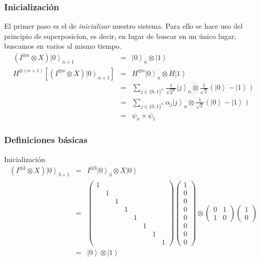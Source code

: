 \begin{frame}
\frametitle{Inicialización}
El primer paso es el de \textit{inicializar} nuestro sistema. Para ello se hace uso del principio de superposicíon, es decir, en lugar de buscar en un único lugar, buscamos en varios al mismo tiempo.
\pause
\begin{eqnarray}
(I^{\otimes n}\otimes X)\left.|0\right\rangle _{n+1}&=&\left.|0\right\rangle _{n}\otimes\left.|1\right\rangle \nonumber\\
H^{\otimes\left(n+1\right)}\left[(I^{\otimes n}\otimes X)\left.|0\right\rangle _{n+1}\right]&=&H^{\otimes n}\left.|0\right\rangle _{n}\otimes H\left.|1\right\rangle \nonumber\\
&=&\sum_{j\in\{0,1\}^{n}}\frac{1}{\sqrt{2^{n}}}\left.|j\right\rangle _{n}\otimes\frac{1}{\sqrt{2}}\left(\left.|0\right\rangle -\left.|1\right\rangle \right)\nonumber\\
&=&\sum_{j\in\{0,1\}^{n}}\alpha_{j}\left.|j\right\rangle _{n}\otimes\frac{1}{\sqrt{2}}\left(\left.|0\right\rangle -\left.|1\right\rangle \right)\nonumber\\
&=&\psi_{n}\times\psi_{1}\nonumber
\end{eqnarray}
\end{frame}

\begin{frame}
\frametitle{Definiciones básicas}

\begin{exampleblock}{Inicialización}
\begin{eqnarray}
(I^{\otimes3}\otimes X)\left.|0\right\rangle _{3+1}&=&I^{\otimes3}\left.|0\right\rangle _{3}\otimes X\left.|0\right\rangle \\&=&\left(\begin{array}{cccccccc}
1\\
 & 1\\
 &  & 1\\
 &  &  & 1\\
 &  &  &  & 1\\
 &  &  &  &  & 1\\
 &  &  &  &  &  & 1\\
 &  &  &  &  &  &  & 1
\end{array}\right)\left(\begin{array}{c}
1\\
0\\
0\\
0\\
0\\
0\\
0\\
0
\end{array}\right)\otimes\left(\begin{array}{cc}
0 & 1\\
1 & 0
\end{array}\right)\left(\begin{array}{c}
1\\
0
\end{array}\right)\\&=&\left.|0\right\rangle \otimes\left.|1\right\rangle 
\end{eqnarray}
\end{exampleblock}


\end{frame}

